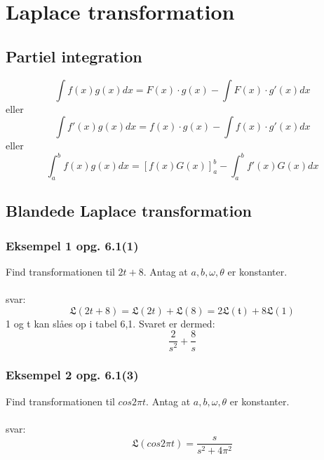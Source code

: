 \documentclass[11pt,fleqn]{book} %
\begin{document}

\chapter{Laplace transformation}
\section{Partiel integration}
\begin{equation}
\int f(x)g(x)dx=F(x)\cdot g(x)-\int F(x) \cdot g'(x)dx
\end{equation}
eller
\begin{equation}
\int f'(x)g(x)dx=f(x)\cdot g(x)-\int f(x) \cdot g'(x)dx
\end{equation}
eller
\begin{equation}
\int_{a}^{b}f(x)g(x)dx=[f(x)G(x)]_{a}^{b}-\int_{a}^{b}f'(x)G(x)dx
\end{equation}

\section{Blandede Laplace transformation}
\subsection{Eksempel 1 opg. 6.1(1)}
Find transformationen til $2t+8$. Antag at $a, b, \omega, \theta$ er konstanter.\\\\
svar:\\
\begin{equation}
\mathfrak{L}(2t+8)=\mathfrak{L}(2t)+\mathfrak{L}(8)=2\mathfrak{L(t)}+8\mathfrak{L}(1)
\end{equation}
1 og t kan slåes op i tabel 6,1. Svaret er dermed:
\begin{equation}
\frac{2}{s^2}+\frac{8}{s}
\end{equation}

\subsection{Eksempel 2  opg. 6.1(3) }
Find transformationen til $cos2 \pi t$. Antag at $a, b, \omega, \theta$ er konstanter.\\\\
svar:\\
\begin{equation}
\mathfrak{L}(cos2\pi t)=\frac{s}{s^2+4\pi^2}
\end{equation}
\end{document}
